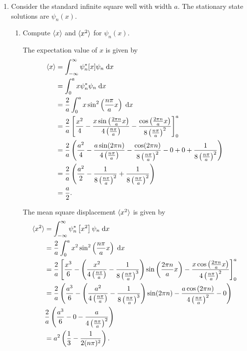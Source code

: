 \documentclass[a4paper, 12pt]{config/homework}
\begin{document}
\begin{enumerate}
\begin{enumerate}[label=(\alph*)]
\end{enumerate}

\pagebreak
\item Consider the standard infinite square well with width \(a\). The stationary state solutions are \(\psi_n(x)\).
\begin{enumerate}[label=(\alph*)]
\item Compute \(\braket{x}\) and \(\braket{x^2}\) for \(\psi_n(x)\).

The expectation value of \(x\) is given by
\begin{align*}
\braket{x} &= \bint{-\infty}{\infty}{\psi_n^* [x] \psi_n}{x}
\\&= \bint{0}{a}{x \psi_n^*\psi_n}{x}
\\&= \frac{2}{a}\bint{0}{a}{x\sin^2\left(\frac{n\pi}{a}x\right)}{x}
\\&= \frac{2}{a}\left[\frac{x^2}{4} - \frac{x\sin\left(\frac{2\pi n}{a}x\right)}{4\left(\frac{n\pi}{a}\right)} - \frac{\cos\left(\frac{2\pi n}{a}x\right)}{8\left(\frac{n\pi}{a}\right)^2}\right]_0^a
\\&= \frac{2}{a} \left( \frac{a^2}{4} - \frac{a\sin(2\pi n)}{4\left(\frac{n\pi}{a}\right)} - \frac{\cos(2\pi n)}{8 \left(\frac{n\pi}{a}\right)^2} - 0 + 0 + \frac{1}{8\left(\frac{n\pi}{a}\right)^2} \right)
\\&= \frac{2}{a}\left(\frac{a^2}{2} - \frac{1}{8 \left(\frac{n\pi}{a}\right)^2} + \frac{1}{8 \left(\frac{n\pi}{a}\right)^2}\right)
\\&= \frac{a}{2}.
\end{align*}

The mean square displacement \(\braket{x^2}\) is given by
\begin{align*}
\braket{x^2} &= \bint{-\infty}{\infty}{\psi_n^*\left[x^2\right]\psi_n}{x}
\\&= \frac{2}{a} \bint{0}{a}{x^2 \sin^2\left(\frac{n\pi}{a}x\right)}{x}
\\&= \frac{2}{a} \left[
\frac{x^3}{6}
- \left(\frac{x^2}{4\left(\frac{n\pi}{a}\right)}
- \frac{1}{8\left(\frac{n\pi}{a}\right)^3}\right)
\sin\left(\frac{2\pi n}{a}x\right)
- \frac{x\cos\left(\frac{2\pi n}{a}x\right)}{4\left(\frac{n\pi}{a}\right)^2}
\right]_0^a
\\&= \frac{2}{a}\left(
\frac{a^3}{6}
- \left(
\frac{a^2}{4\left(\frac{n\pi}{a}\right)}
- \frac{1}{8\left(\frac{n\pi}{a}\right)^3}
\right)\sin(2\pi n)
- \frac{a \cos\left(2\pi n\right)}{4\left(\frac{n\pi}{a}\right)^2}
- 0 \right)
\\& \frac{2}{a} \left(\frac{a^3}{6} - 0 - \frac{a}{4\left(\frac{n\pi}{a}\right)^2}\right)
\\&= a^2 \left(\frac{1}{3} - \frac{1}{2(n\pi)^2}\right).
\end{align*}


\end{enumerate}
\end{enumerate}
\end{document}
